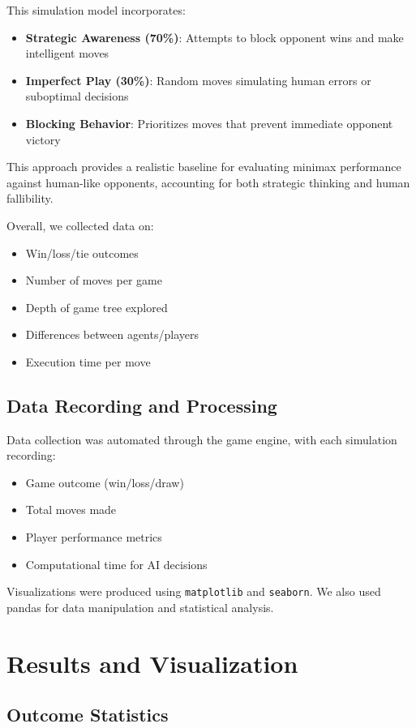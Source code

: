 \documentclass[12pt]{article}
\begin{document}
This simulation model incorporates:
\begin{itemize}
    \item \textbf{Strategic Awareness (70\%)}: Attempts to block opponent wins and make intelligent moves
    \item \textbf{Imperfect Play (30\%)}: Random moves simulating human errors or suboptimal decisions
    \item \textbf{Blocking Behavior}: Prioritizes moves that prevent immediate opponent victory
\end{itemize}

This approach provides a realistic baseline for evaluating minimax performance against human-like opponents, accounting for both strategic thinking and human fallibility.

Overall, we collected data on:
\begin{itemize}
  \item Win/loss/tie outcomes
  \item Number of moves per game
  \item Depth of game tree explored
  \item Differences between agents/players
  \item Execution time per move
\end{itemize}

\subsection{Data Recording and Processing}

Data collection was automated through the game engine, with each simulation recording:
\begin{itemize}
    \item Game outcome (win/loss/draw)
    \item Total moves made
    \item Player performance metrics
    \item Computational time for AI decisions
\end{itemize}

Visualizations were produced using \texttt{matplotlib} and \texttt{seaborn}. We also used pandas for data manipulation and statistical analysis.

\section{Results and Visualization}

\subsection{Outcome Statistics}
\end{document}
